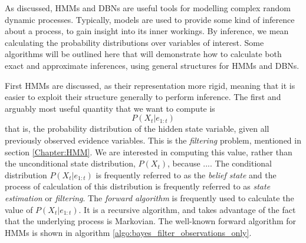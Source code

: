 As discussed, HMMs and DBNs are useful tools for modelling complex random dynamic processes. Typically, models are used to provide some kind of inference about a process, to gain insight into its inner workings. By inference, we mean calculating the probability distributions over variables of interest. Some algorithms will be outlined here that will demonstrate how to calculate both exact and approximate inferences, using general structures for HMMs and DBNs. \par

First HMMs are discussed, as their representation more rigid, meaning that it is easier to exploit their structure generally to perform inference. The first and arguably most useful quantity that we want to compute is 
\[P(X_t | e_{1:t})\]
that is, the probability distribution of the hidden state variable, given all previously observed evidence variables. This is the \textit{filtering} problem, mentioned in section \ref{Chapter:HMM}. We are interested in computing this value, rather than the unconditional state distribution, $P(X_t)$, because .... The conditional distribution $P(X_t | e_{1:t})$ is frequently referred to as the \textit{belief state} and the process of calculation of this distribution is frequently referred to as \textit{state estimation} or \textit{filtering}. The \textit{forward algorithm} is frequently used to calculate the value of $P(X_t | e_{1:t})$. It is a recursive algorithm, and takes advantage of the fact that the underlying process is Markovian. The well-known forward algorithm for HMMs is shown in algorithm \ref{algo:bayes_filter_observations_only}. 

 

